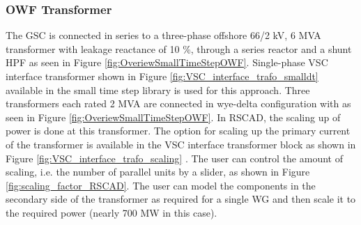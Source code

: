 \subsubsection{OWF Transformer}\label{scaling_OWF}
The \gls{GSC} is connected in series to a three-phase offshore 66/2 kV, 6 MVA transformer with leakage reactance of 10 \%, through a series reactor and a shunt \gls{HPF} as seen in Figure \ref{fig:OveriewSmallTimeStepOWF}. Single-phase \gls{VSC} interface transformer shown in Figure \ref{fig:VSC_interface_trafo_smalldt} available in the small time step library is used for this approach. Three transformers each rated 2 MVA are connected in wye-delta configuration with as seen in Figure \ref{fig:OveriewSmallTimeStepOWF}. In RSCAD, the scaling up of power is done at this transformer. The option for scaling up the primary current of the transformer is available in the \gls{VSC} interface transformer block as shown in Figure \ref{fig:VSC_interface_trafo_scaling} \cite{rtds_tech}. The user can control the amount of scaling, i.e. the number of parallel units by a slider, as shown in Figure \ref{fig:scaling_factor_RSCAD}. The user can model the components in the secondary side of the transformer as required for a single \gls{WG} and then scale it to the required power (nearly 700 MW in this case).

